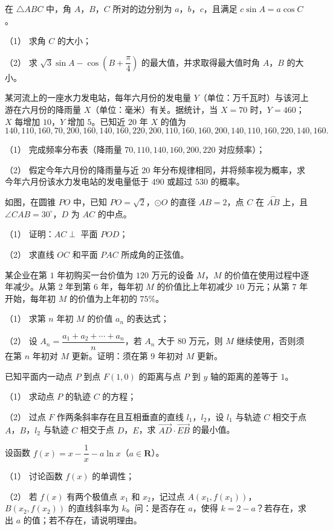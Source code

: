 \begin{question}
在 $\triangle ABC$ 中，角 $A$，$B$，$C$ 所对的边分别为 $a$，$b$，$c$，且满足 $c\sin A=a\cos C$。

（1） 求角 $C$ 的大小；

（2） 求 $\sqrt3\sin A-\cos\left(B+\dfrac\pi4\right)$ 的最大值，并求取得最大值时角 $A$，$B$ 的大小。

\end{question}
\begin{question}
某河流上的一座水力发电站，每年六月份的发电量 $Y$（单位：万千瓦时）与该河上游在六月份的降雨量 $X$（单位：毫米）有关。据统计，当 $X=70$ 时，$Y=460$；$X$ 每增加 $10$，$Y$ 增加 $5$。已知近 $20$ 年 $X$ 的值为
\nopagebreak[4]
\[140,110,160,70,200,160,140,160,220,200,110,160,160,200,140,110,160,220,140,160.\]

（1） 完成频率分布表（降雨量 $70,110,140,160,200,220$ 对应频率）；

（2） 假定今年六月份的降雨量与近 $20$ 年分布规律相同，并将频率视为概率，求今年六月份该水力发电站的发电量低于 $490$ 或超过 $530$ 的概率。

\Needspace{0.4\textheight}
\end{question}
\begin{question}
如图，在圆锥 $PO$ 中，已知 $PO=\sqrt2$，$\odot O$ 的直径 $AB=2$，点 $C$ 在 $\overset{\frown}{AB}$ 上，且 $\angle CAB=30^\circ$，$D$ 为 $AC$ 的中点。

（1） 证明：$AC\perp$ 平面 $POD$；

（2） 求直线 $OC$ 和平面 $PAC$ 所成角的正弦值。
\nopagebreak[4]
\begin{center}\end{center}
\nopagebreak[4]
\end{question}
\begin{question}
某企业在第 $1$ 年初购买一台价值为 $120$ 万元的设备 $M$，$M$ 的价值在使用过程中逐年减少。从第 $2$ 年到第 $6$ 年，每年初 $M$ 的价值比上年初减少 $10$ 万元；从第 $7$ 年开始，每年初 $M$ 的价值为上年初的 $75\%$。

（1） 求第 $n$ 年初 $M$ 的价值 $a_n$ 的表达式；

（2） 设 $A_n=\dfrac{a_1+a_2+\cdots+a_n}{n}$，若 $A_n$ 大于 $80$ 万元，则 $M$ 继续使用，否则须在第 $n$ 年初对 $M$ 更新。证明：须在第 $9$ 年初对 $M$ 更新。

\end{question}
\begin{question}
已知平面内一动点 $P$ 到点 $F(1,0)$ 的距离与点 $P$ 到 $y$ 轴的距离的差等于 $1$。

（1） 求动点 $P$ 的轨迹 $C$ 的方程；

（2） 过点 $F$ 作两条斜率存在且互相垂直的直线 $l_1$，$l_2$，设 $l_1$ 与轨迹 $C$ 相交于点 $A$，$B$，$l_2$ 与轨迹 $C$ 相交于点 $D$，$E$，求 $\overrightarrow{AD}\cdot\overrightarrow{EB}$ 的最小值。

\end{question}
\begin{question}
设函数 $f(x)=x-\dfrac1x-a\ln x$（$a\in\mathbf R$）。

（1） 讨论函数 $f(x)$ 的单调性；

（2） 若 $f(x)$ 有两个极值点 $x_1$ 和 $x_2$，记过点 $A(x_1,f(x_1))$，$B(x_2,f(x_2))$ 的直线斜率为 $k$。问：是否存在 $a$，使得 $k=2-a$？若存在，求出 $a$ 的值；若不存在，请说明理由。

\end{question}